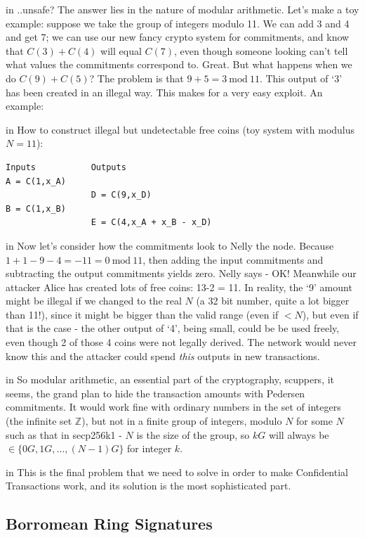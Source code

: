 \documentclass[10pt,a4paper]{article}
\begin{document}
 in \noindent ..unsafe? The answer lies in the nature of modular arithmetic. Let's make a toy example: suppose we take the group of integers modulo 11. We can add 3 and 4 and get 7; we can use our new fancy crypto system for commitments, and know that $C(3) + C(4)$ will equal $C(7)$, even though someone looking can't tell what values the commitments correspond to. Great. But what happens when we do $C(9) + C(5)$? The problem is that $9 + 5 = 3 \ \textrm{mod}\ 11$. This output of `3' has been created in an illegal way. This makes for a very easy exploit. An example:

 in \noindent How to construct illegal but undetectable free coins (toy system with modulus $N=11$):
\begin{verbatim}
Inputs           Outputs
A = C(1,x_A)
                 D = C(9,x_D)
B = C(1,x_B)
                 E = C(4,x_A + x_B - x_D)
\end{verbatim}


 in \noindent Now let's consider how the commitments look to Nelly the node. Because $1 + 1 -9 - 4 = -11 = 0 \ \textrm{mod} \ 11$, then adding the input commitments and subtracting the output commitments yields zero. Nelly says - OK! Meanwhile our attacker Alice has created lots of free coins: 13-2 = 11. In reality, the `9' amount might be illegal if we changed to the real $N$ (a 32 bit number, quite a lot bigger than 11!), since it might be bigger than the valid range (even if $< N$), but even if that is the case - the other output of `4', being small, could be be used freely, even though 2 of those 4 coins were not legally derived. The network would never know this and the attacker could spend \textit{this} outputs in new transactions.

 in \noindent So modular arithmetic, an essential part of the cryptography, scuppers, it seems, the grand plan to hide the transaction amounts with Pedersen commitments. It would work fine with ordinary numbers in the set of integers (the infinite set $\mathbb{Z}$), but not in a finite group of integers, modulo $N$ for some $N$ such as that in secp256k1 - $N$ is the size of the group, so $kG$ will always be $\in \{0G, 1G, \ldots ,(N-1)G\}$ for integer $k$.

 in \noindent This is the final problem that we need to solve in order to make Confidential Transactions work, and its solution is the most sophisticated part.

\subsection{Borromean Ring Signatures}
\end{document}
